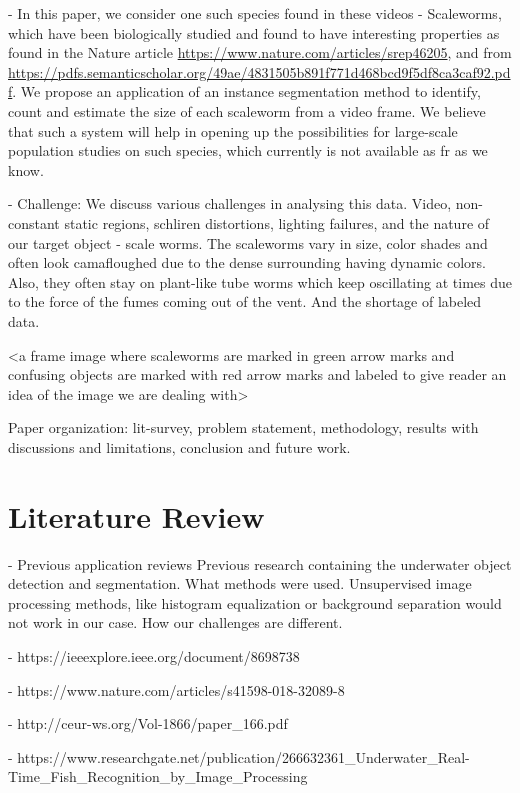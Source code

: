 \documentclass[10pt,twocolumn,letterpaper]{article}
\begin{document}
- In this paper, we consider one such species found in these videos - Scaleworms, which have been biologically studied and found to have interesting properties as found in the Nature article \href{Nature article}{https://www.nature.com/articles/srep46205}, and from \href{another study}{https://pdfs.semanticscholar.org/49ae/4831505b891f771d468bcd9f5df8ca3caf92.pdf}. We propose an application of an instance segmentation method to identify, count and estimate the size of each scaleworm from a video frame. We believe that such a system will help in opening up the possibilities for large-scale population studies on such species, which currently is not available as fr as we know.

- Challenge: We discuss various challenges in analysing this data. Video, non-constant static regions, schliren distortions, lighting failures, and the nature of our target object - scale worms. The scaleworms vary in size, color shades and often look camafloughed due to the dense surrounding having dynamic colors. Also, they often stay on plant-like tube worms which keep oscillating at times due to the force of the fumes coming out of the vent. And the shortage of labeled data.

<a frame image where scaleworms are marked in green arrow marks and confusing objects are marked with red arrow marks and labeled to give reader an idea of the image we are dealing with>

Paper organization: lit-survey, problem statement, methodology, results with discussions and limitations, conclusion and future work.

\section{Literature Review}

- Previous application reviews
Previous research containing the underwater object detection and segmentation. What methods were used. Unsupervised image processing methods, like histogram equalization or background separation would not work in our case. How our challenges are different.

    - https://ieeexplore.ieee.org/document/8698738

    - https://www.nature.com/articles/s41598-018-32089-8
 
    - http://ceur-ws.org/Vol-1866/paper_166.pdf
 
    - https://www.researchgate.net/publication/266632361_Underwater_Real-Time_Fish_Recognition_by_Image_Processing
 
\end{document}
